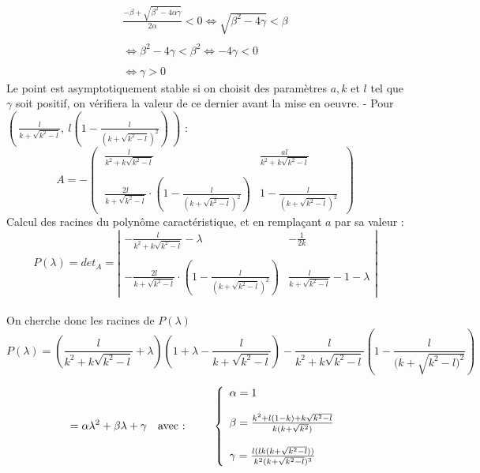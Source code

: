 \documentclass{article}
\begin{document}
\begin{equation*}
    \begin{array}{cc}
        \frac{- \beta + \sqrt{\beta^{2} - 4 \alpha \gamma}}{2\alpha} < 0 
        \iff \sqrt{\beta^{2} - 4 \gamma } < \beta \\\\ \iff
        \beta^{2} - 4 \gamma < \beta^{2}  \iff
        -4 \gamma < 0 \\\\ \iff
        \gamma > 0 
    \end{array}
\end{equation*}
Le point est  asymptotiquement stable  si on choisit des paramètres $a,k$ et $l$ tel que $\gamma$ soit positif, on vérifiera la valeur de ce dernier avant la mise en oeuvre.
\newpage
\noindent
- Pour $\left(\ \frac{l}{k + \sqrt{k^2 - l}},\ l\left(1 - \frac{l}{(k + \sqrt{k^2 - l})^2} \right)\ \right)$ :
\begin{equation*}
    A = -
    \begin{pmatrix}
        \ \frac{l}{k^2 + k\sqrt{k^2 - l}} & \frac{al}{k^2 + k\sqrt{k^2 - l}} \phantom{\ }\\\\
        \ \frac{2l}{k + \sqrt{k^2 - l}} \cdot (1 - \frac{l}{(k + \sqrt{k^2 - l})^2}) & 1 - \frac{l}{(k + \sqrt{k^2 - l})^2} \phantom{\ }
    \end{pmatrix}
\end{equation*}
Calcul des racines du polynôme caractéristique, et en remplaçant $a$ par sa valeur : 
\begin{equation*}
    P(\lambda) = det_{A} = 
    \left|
    \begin{array}{lr}
        -\frac{l}{k^2 + k\sqrt{k^2 - l}} - \lambda & -\frac{1}{2k}  \\ \\
        -\frac{2l}{k + \sqrt{k^2 - l}} \cdot (1 - \frac{l}{(k + \sqrt{k^2 - l})^2}) & \frac{l}{k + \sqrt{k^2 - l}}- 1 -\lambda 
    \end{array}
    \right|
\end{equation*} \\
On cherche donc les racines de $P(\lambda)$
\begin{equation}
\tag{P}
    P(\lambda)  = (\dfrac{l}{k^2+k\sqrt{k^2-l}}+\lambda)(1+\lambda-\frac{l}{k+\sqrt{k^2-l}})-\dfrac{l}{k^2+k\sqrt{k^2-l}}(1-\frac{l}{(k+\sqrt{k^2-l)^2}})
\end{equation}

\begin{equation*}
    = \alpha \lambda^{2} + \beta \lambda + \gamma \text{\quad avec : \qquad}
    \left \{
    \begin{array}{l}
        \alpha =  1\\\\ 
        \beta =   \frac{k^{2} + l(1-k) + k \sqrt{k^{2} - l}}{k(k + \sqrt{k^{2} })}\\\\
        \gamma =  \frac{l (lk(k+\sqrt{k^{2}-l}))}{k^{2}( k + \sqrt{k^{2} - l})^{3} }\\ 
    \end{array}
\right.
\end{equation*}
\end{document}
